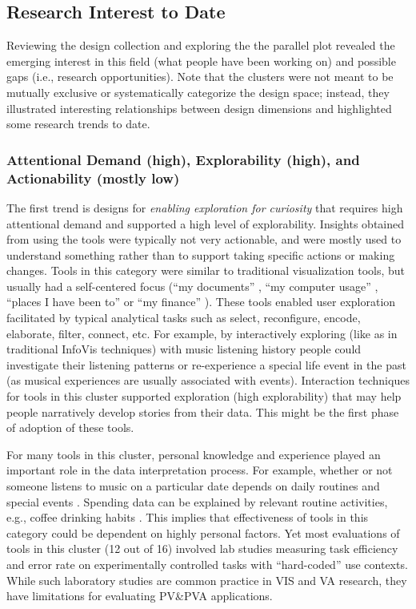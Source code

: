 \documentclass[12pt,oneside]{book}
\begin{document}
\subsection{Research Interest to Date}
Reviewing the design collection and exploring the the parallel plot revealed the emerging interest in this field (what people have been working on) and possible gaps (i.e., research opportunities).  Note that the clusters were not meant to be mutually exclusive or systematically categorize the design space; instead, they illustrated interesting relationships between design dimensions and highlighted some research trends to date. 

\subsubsection{Attentional Demand (high), Explorability (high), and Actionability (mostly low)}
The first trend is designs for \textit{enabling exploration for curiosity} that requires high attentional demand and supported a high level of explorability. Insights obtained from using the tools were typically not very actionable, and were mostly used to understand something rather than to support taking specific actions or making changes.
Tools in this category were similar to traditional visualization tools, but usually had a self-centered focus (``my documents'' \cite{antunes_this_2009}, ``my computer usage'' \cite{barata_appinsight:_2012}, ``places I have been to'' \cite{kalnikaite_now_2010} or ``my finance'' \cite{schwarz_reflections_2009}).  These tools enabled user exploration facilitated by typical analytical tasks such as select, reconfigure, encode, elaborate, filter, connect, etc.  For example,  by interactively exploring (like as in traditional InfoVis techniques) with music listening history \cite{baur_streams_2010} people could investigate their listening patterns or re-experience a special life event in the past (as musical experiences are usually associated with events).  Interaction techniques for tools in this cluster supported exploration (high explorability) that may help people narratively develop stories from their data. This might be the first phase of adoption of these tools. 

For many tools in this cluster, personal knowledge and experience played an important role in the data interpretation process.  For example, whether or not someone listens to music on a particular date depends on daily routines and special events \cite{baur_streams_2010}.  Spending data can be explained by relevant routine activities, e.g., coffee drinking habits \cite{schwarz_reflections_2009}.  This implies that effectiveness of tools in this category could be dependent on highly personal factors. Yet most evaluations of tools in this cluster (12 out of 16) involved lab studies measuring task efficiency and error rate on experimentally controlled tasks with ``hard-coded'' use contexts. While such laboratory studies are common practice in VIS and VA research, they have limitations for evaluating PV\&PVA applications. 
\end{document}
